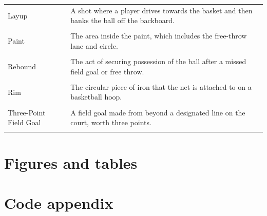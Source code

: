\documentclass[
  12pt,
  a4paper,
]{article}
\begin{document}
\begin{table}[H]
{\begin{tabular}{ll}
Layup & A shot where a player drives towards the basket and then banks the ball off the backboard.\\
\cellcolor{gray!30}{Mid-range} & \cellcolor{gray!30}{A shot taken about 10-20 feet from the basket.}\\
Paint & The area inside the paint, which includes the free-throw lane and circle.\\
\cellcolor{gray!30}{Perimeter} & \cellcolor{gray!30}{The outer area of the half-court, beyond the free-throw circle and within the three-point line.}\\
Rebound & The act of securing possession of the ball after a missed field goal or free throw.\\
\cellcolor{gray!30}{Restricted Area} & \cellcolor{gray!30}{The four-foot arc from the center of the hoop. Offensive players cannot draw charging fouls within this area.}\\
Rim & The circular piece of iron that the net is attached to on a basketball hoop.\\
\cellcolor{gray!30}{Steal} & \cellcolor{gray!30}{When a defensive player legally causes an opponent to turn over the ball.}\\
Three-Point Field Goal & A field goal made from beyond a designated line on the court, worth three points.\\
\cellcolor{gray!30}{Turnover} & \cellcolor{gray!30}{When a player loses possession of the ball, resulting in the ball being awarded to the opponent.}\\
\bottomrule
\end{tabular}}
\end{table}

\newpage

\hypertarget{figures-and-tables}{%
\section{Figures and tables}\label{figures-and-tables}}

\listoffigures
\listoftables


\newpage

\hypertarget{code-appendix}{%
\section{Code appendix}\label{code-appendix}}
\end{document}
